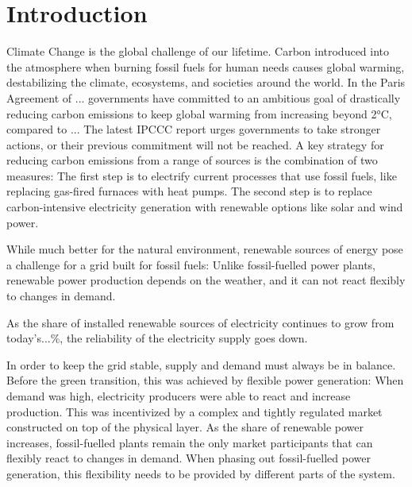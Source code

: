 
\chapter{Introduction}\label{Introduction}

Climate Change is the global challenge of our lifetime. Carbon introduced into the atmosphere when burning fossil fuels for human needs causes global warming, destabilizing the climate, ecosystems, and societies around the world.
In the Paris Agreement of ... governments have committed to an ambitious goal of drastically reducing carbon emissions to keep global warming from increasing beyond 2°C, compared to ...
The latest IPCCC report urges governments to take stronger actions, or their previous commitment will not be reached.
A key strategy for reducing carbon emissions from a range of sources is the combination of two measures: The first step is to electrify current processes that use fossil fuels, like replacing gas-fired furnaces with heat pumps. The second step is to replace carbon-intensive electricity generation with renewable options like solar and wind power.

While much better for the natural environment, renewable sources of energy pose a challenge for a grid built for fossil fuels: Unlike fossil-fuelled power plants, renewable power production depends on the weather, and it can not react flexibly to changes in demand.

As the share of installed renewable sources of electricity continues to grow from today's...\%, the reliability of the electricity supply goes down.


In order to keep the grid stable, supply and demand must always be in balance. Before the green transition, this was achieved by flexible power generation: When demand was high, electricity producers were able to react and increase production.
This was incentivized by a complex and tightly regulated market constructed on top of the physical layer.
As the share of renewable power increases, fossil-fuelled plants remain the only market participants that can flexibly react to changes in demand.
When phasing out fossil-fuelled power generation, this flexibility needs to be provided by different parts of the system.


